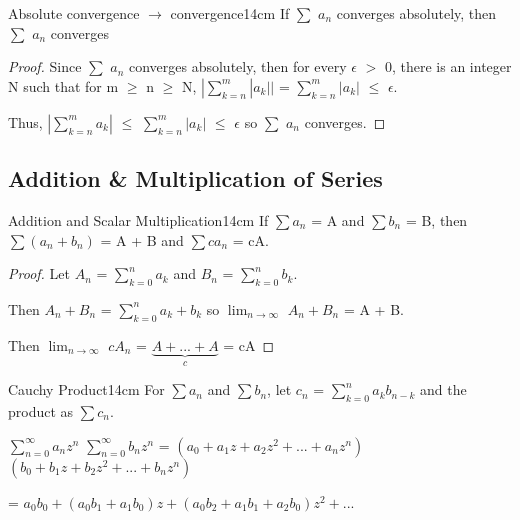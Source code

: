     \vspace{0.5cm}



    \begin{wtheorem}{Absolute convergence $\rightarrow$ convergence}{14cm}
        If $\sum$ $a_n$ converges absolutely, then $\sum$ $a_n$ converges
    \end{wtheorem}

    \begin{proof}
        Since $\sum$ $a_n$ converges absolutely, then for every
        $\epsilon$ $>$ 0, there is an integer N such that for m $\geq$ n $\geq$ N,
        $|\sum_{k=n}^m |a_k||$ = $\sum_{k=n}^m |a_k|$ $\leq$ $\epsilon$.

        Thus, 
        $|\sum_{k=n}^m a_k|$
        $\leq$ $\sum_{k=n}^m |a_k|$
        $\leq$ $\epsilon$
        so $\sum$ $a_n$ converges.
    \end{proof}

    \vspace{0.5cm}





\subsection[Addition \& Multiplication]{ Addition \& Multiplication of Series }

    \begin{wtheorem}{Addition and Scalar Multiplication}{14cm}
        If $\sum a_n$ = A and $\sum b_n$ = B, then
        $\sum (a_n + b_n)$ = A + B and $\sum ca_n$ = cA.
    \end{wtheorem}

    \begin{proof}
        Let $A_n$ = $\sum_{k=0}^n a_k$ and $B_n$ = $\sum_{k=0}^n b_k$.

        Then $A_n + B_n$ = $\sum_{k=0}^n a_k + b_k$
        so $\lim_{n \rightarrow \infty}$ $A_n + B_n$
        = A + B.

        Then $\lim_{n \rightarrow \infty}$ $cA_n$
        = $\underbrace{A + ... + A}_c$ = cA
    \end{proof}

    \newpage



    \begin{definition}{Cauchy Product}{14cm}
        For $\sum a_n$ and $\sum b_n$, let
        $c_n$ = $\sum_{k=0}^n a_k b_{n-k}$
        and the product as $\sum c_n$.

        \vspace{0.2cm}

        $\sum_{n=0}^{\infty} a_n z^n$ $\sum_{n=0}^{\infty} b_n z^n$
        = $(a_0 + a_1z + a_2z^2 + ... + a_nz^n)$
        $(b_0 + b_1z + b_2z^2 + ... + b_nz^n)$

        \hspace{3.9cm}
        = $a_0b_0 + (a_0b_1 + a_1b_0)z + (a_0b_2 + a_1b_1 + a_2b_0)z^2 + ... $
    \end{definition}

